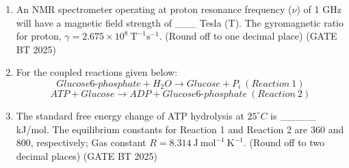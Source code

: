 \documentclass[journal,12pt,onecolumn]{IEEEtran}
\theoremstyle{remark}
\begin{document}
\begin{enumerate}
\item An NMR spectrometer operating at proton resonance frequency (\(\nu\)) of 1 GHz will have a magnetic field strength of \_\_\_ Tesla (T).  
The gyromagnetic ratio for proton, \(\gamma = 2.675 \times 10^8 \ \text{T}^{-1} \text{s}^{-1}\).  
(Round off to one decimal place)  
\hfill (GATE BT 2025)

\item For the coupled reactions given below:  
\[
Glucose6\text{-}phosphate + H_2O \longrightarrow Glucose + P_i \ (Reaction\ 1)
\]  
\[
ATP + Glucose \longrightarrow ADP + Glucose6\text{-}phosphate \ (Reaction\ 2)
\]  
\item The standard free energy change of ATP hydrolysis at $25^\circ C$ is \_\_\_\_\_ kJ/mol.  
The equilibrium constants for Reaction 1 and Reaction 2 are 360 and 800, respectively; Gas constant $R = 8.314\ \mathrm{J\ mol^{-1}\ K^{-1}}$.  
(Round off to two decimal places)  
\hfill (GATE BT 2025)

\end{enumerate}
\end{document}
